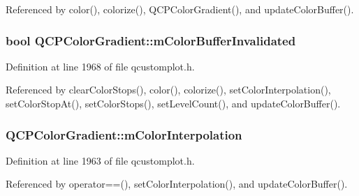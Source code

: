 Referenced by color(), colorize(), Q\+C\+P\+Color\+Gradient(), and update\+Color\+Buffer().

\hypertarget{class_q_c_p_color_gradient_abacf55e11f67d6722a687af1bb2687bd}{}
\subsubsection[{m\+Color\+Buffer\+Invalidated}]{\setlength{\rightskip}{0pt plus 5cm}bool Q\+C\+P\+Color\+Gradient\+::m\+Color\+Buffer\+Invalidated\hspace{0.3cm}{\ttfamily [protected]}}\label{class_q_c_p_color_gradient_abacf55e11f67d6722a687af1bb2687bd}


Definition at line 1968 of file qcustomplot.\+h.



Referenced by clear\+Color\+Stops(), color(), colorize(), set\+Color\+Interpolation(), set\+Color\+Stop\+At(), set\+Color\+Stops(), set\+Level\+Count(), and update\+Color\+Buffer().

\hypertarget{class_q_c_p_color_gradient_a028cef73d863800a9ee93ffd641cce01}{}
\subsubsection[{m\+Color\+Interpolation}]{ Q\+C\+P\+Color\+Gradient\+::m\+Color\+Interpolation\hspace{0.3cm}{\ttfamily [protected]}}\label{class_q_c_p_color_gradient_a028cef73d863800a9ee93ffd641cce01}


Definition at line 1963 of file qcustomplot.\+h.



Referenced by operator==(), set\+Color\+Interpolation(), and update\+Color\+Buffer().

\hypertarget{class_q_c_p_color_gradient_a9e11a2b0974ef289d12c324822bc3a3e}{}
